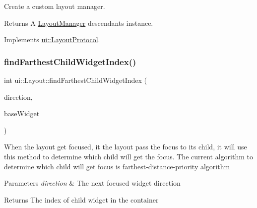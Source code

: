 Create a custom layout manager. 

\begin{DoxyReturn}{Returns}
A \hyperlink{classui_1_1LayoutManager}{Layout\+Manager} descendants instance. 
\end{DoxyReturn}


Implements \hyperlink{classui_1_1LayoutProtocol_a4ff58063d53e9e9b9684a1e2e6cc485a}{ui\+::\+Layout\+Protocol}.

\mbox{\label{classui_1_1Layout_aa40ce38ab200edba57e704834b395a4a}} 
\subsubsection{\texorpdfstring{find\+Farthest\+Child\+Widget\+Index()}{findFarthestChildWidgetIndex()}\hspace{0.1cm}{\footnotesize\ttfamily [1/2]}}
{\footnotesize\ttfamily int ui\+::\+Layout\+::find\+Farthest\+Child\+Widget\+Index (\begin{DoxyParamCaption}\item[{\hyperlink{classui_1_1Widget_a8ae8e8fc793a04a87584205cd1e8a8a5}{Focus\+Direction}}]{direction,  }\item[{\hyperlink{classui_1_1Widget}{Widget} $\ast$}]{base\+Widget }\end{DoxyParamCaption})\hspace{0.3cm}{\ttfamily [protected]}}

When the layout get focused, it the layout pass the focus to its child, it will use this method to determine which child will get the focus. The current algorithm to determine which child will get focus is farthest-\/distance-\/priority algorithm 
\begin{DoxyParams}{Parameters}
{\em direction} & The next focused widget direction \\
\hline
\end{DoxyParams}
\begin{DoxyReturn}{Returns}
The index of child widget in the container 
\end{DoxyReturn}
\mbox{\label{classui_1_1Layout_aa40ce38ab200edba57e704834b395a4a}} 
